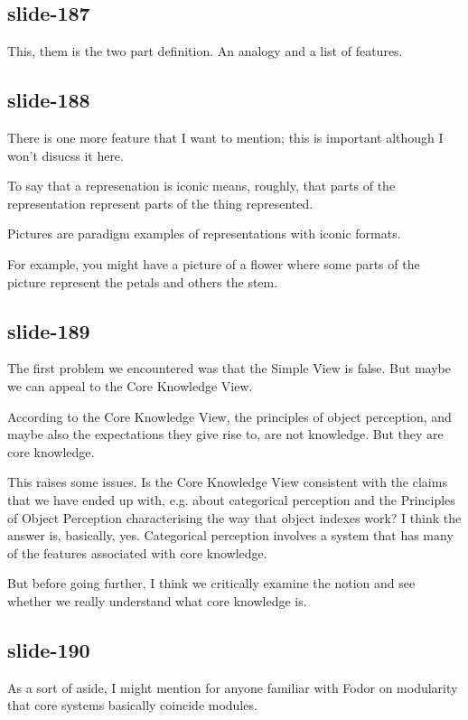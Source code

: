\documentclass[12pt,\papersize]{extarticle}
\begin{document}
\subsection{slide-187}
 
This, them is the two part definition.  An analogy and a list of features.
 
\subsection{slide-188}
There is one more feature that I want to mention; this is important although I won't disucss it here.
 
To say that a represenation is iconic means, roughly, that parts of the representation represent parts of the thing represented.
 
Pictures are paradigm examples of representations with iconic formats.
 
For example, you might have a picture of a flower where some parts of the picture represent the petals and others the stem.
 
\subsection{slide-189}
The first problem we encountered was that the Simple View is false.
But maybe we can appeal to the Core Knowledge View.
 
According to the Core Knowledge View, the principles of object perception, and maybe also the 
expectations they give rise to, are not knowledge.
But they are core knowledge.
 
This raises some issues.  Is the Core Knowledge View consistent with the claims that 
we have ended up with, e.g. about categorical perception and the Principles of Object 
Perception characterising the way that object indexes work?
I think the answer is, basically, yes.  Categorical perception involves a system that has
many of the features associated with core knowledge.
 
But before going further, I think we critically examine the notion and see whether we really
understand what core knowledge is.
 
\subsection{slide-190}
As a sort of aside, I might mention for anyone familiar with Fodor on modularity 
that core systems basically coincide modules.
 
\end{document}
